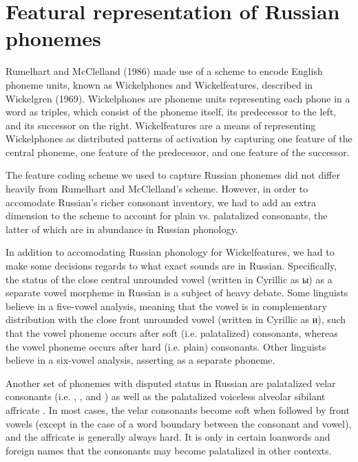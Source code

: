 \documentclass[11pt,a4paper]{article}
\begin{document}
\section{Featural representation of Russian phonemes}

Rumelhart and McClelland (1986) made use of a scheme to encode
English phoneme units, known as Wickelphones and Wickelfeatures, described
in Wickelgren (1969). Wickelphones are phoneme units representing
each phone in a word as triples, which consist of the phoneme itself,
its predecessor to the left, and its successor on the right.
Wickelfeatures are a means of representing Wickelphones as distributed
patterns of activation by capturing one feature of the central phoneme,
one feature of the predecessor, and one feature of the successor.

The feature coding scheme we used to capture Russian phonemes did not
differ heavily from Rumelhart and McClelland's scheme. However, in order
to accomodate Russian's richer consonant inventory, we had to add an
extra dimension to the scheme to account for plain vs. palatalized
consonants, the latter of which are in abundance in Russian phonology.

In addition to accomodating Russian phonology for Wickelfeatures, we had to make some
decisions regards to what exact sounds are in Russian. Specifically,
the status of the close central unrounded vowel \textipa{/\textbari/} 
(written in Cyrillic as \foreignlanguage{russian}{ы}) as a separate 
vowel morpheme in Russian is a subject of heavy debate. Some linguists 
believe in a five-vowel analysis, meaning that the vowel \textipa{/\textbari/} 
is in complementary distribution with the close front unrounded vowel 
 (written in Cyrillic as \foreignlanguage{russian}{и}), 
such that the vowel phoneme  occurs after soft (i.e. 
palatalized) consonants, whereas the vowel phoneme \textipa{/\textbari/} 
occurs after hard (i.e. plain) consonants. Other linguists believe in a
six-vowel analysis, asserting \textipa{/\textbari/} as a separate phoneme.

Another set of phonemes with disputed status in Russian are palatalized
velar consonants (i.e. , , 
and ) as well as the palatalized voiceless alveolar
sibilant affricate . In most cases, the velar consonants
become soft when followed by front vowels (except in the case of a word
boundary between the consonant and vowel), and the affricate is generally
always hard. It is only in certain loanwords and foreign names that
the consonants may become palatalized in other contexts.
\end{document}

